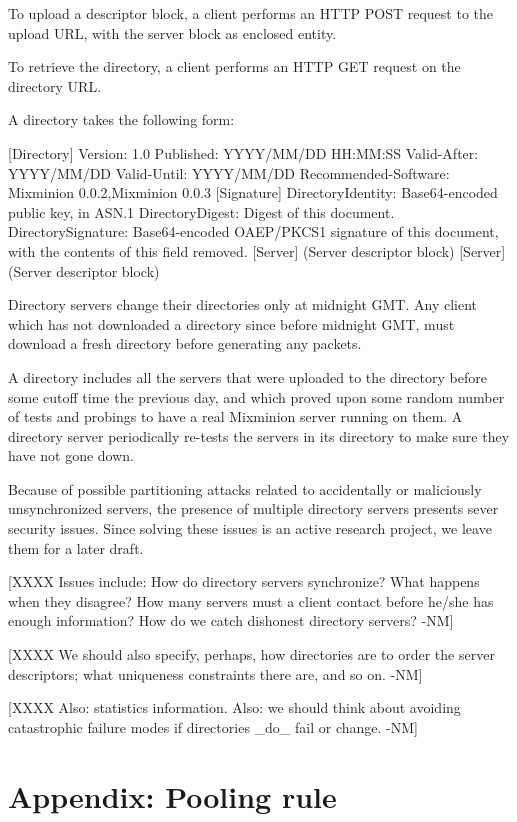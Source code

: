 To upload a descriptor block, a client performs an HTTP POST request
to the upload URL, with the server block as enclosed entity.

To retrieve the directory, a client performs an HTTP GET request on
the directory URL.

A directory takes the following form:

 [Directory]
 Version: 1.0
 Published: YYYY/MM/DD HH:MM:SS
 Valid-After: YYYY/MM/DD
 Valid-Until: YYYY/MM/DD
 Recommended-Software: Mixminion 0.0.2,Mixminion 0.0.3
 [Signature]
 DirectoryIdentity: Base64-encoded public key, in ASN.1
 DirectoryDigest: Digest of this document.
 DirectorySignature: Base64-encoded OAEP/PKCS1 signature of this document, with
     the contents of this field removed.
 [Server]
     (Server descriptor block)
 [Server]
     (Server descriptor block)

Directory servers change their directories only at midnight GMT.  Any
client which has not downloaded a directory since before midnight GMT,
must download a fresh directory before generating any packets.

A directory includes all the servers that were uploaded to the
directory before some cutoff time the previous day, and which proved
upon some random number of tests and probings to have a real Mixminion
server running on them.  A directory server periodically re-tests
the servers in its directory to make sure they have not gone down.

Because of possible partitioning attacks related to accidentally or
maliciously unsynchronized servers, the presence of multiple directory
servers presents sever security issues.  Since solving these issues is
an active research project, we leave them for a later draft.

[XXXX Issues include:  How do directory servers synchronize?
   What happens when they disagree?  How many servers must a client
   contact before he/she has enough information?  How do we catch
   dishonest directory servers? -NM]

[XXXX We should also specify, perhaps, how directories are to order
   the server descriptors; what uniqueness constraints there are, and so
   on. -NM]

[XXXX Also: statistics information. Also: we should think about
   avoiding catastrophic failure modes if directories _do_ fail or
   change. -NM]

\section{Appendix: Pooling rule}

